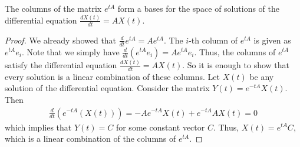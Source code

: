 \begin{theorem}
    The columns of the matrix $e^{tA}$ form a bases for the space of solutions of the differential equation $\frac{dX(t)}{dt} = A X(t)$.
\end{theorem}

\begin{proof}
    We already showed that $\frac{d}{dt} e^{tA} = A e^{tA}$. The $i$-th column of $e^{tA}$ is given as $e^{tA}e_{i}$. Note that we simply have $\frac{d}{dt} (e^{tA} e_{i}) = A e^{tA} e_{i}$. Thus, the columns of $e^{tA}$ satisfy the differential equation $\frac{dX(t)}{dt} = A X(t)$. So it is enough to show that every solution is a linear combination of these columns. Let $X(t)$ be any solution of the differential equation. Consider the matrix $Y(t) = e^{-tA} X(t)$. Then
    \begin{align}
        \frac{d}{dt} (e^{-tA}(X(t))) = -A e^{-tA} X(t) + e^{-tA} A X(t) = 0
    \end{align}
    which implies that $Y(t) = C$ for some constant vector $C$. Thus, $X(t) = e^{tA} C$, which is a linear combination of the columns of $e^{tA}$.
\end{proof}